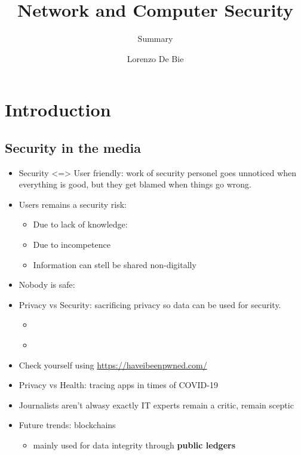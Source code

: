 \documentclass[11pt, faculty=ea]{ugent2016-report}
\title{Network and Computer Security}
\subtitle{Summary}
\author{Lorenzo De Bie}
\begin{document}
\maketitle
\tableofcontents

\chapter{Introduction} \label{cha:introduction}
\section{Security in the media} \label{sec:security-in-the-media}
    \begin{itemize}
        \item Security <=> User friendly: work of security personel goes unnoticed when everything is good, but they get blamed when things go wrong.
        \item Users remains a security risk:
            \begin{itemize}
                \item Due to lack of knowledge:  \cite{Rodriguez2014}
                \item Due to incompetence
                \item Information can stell be shared non-digitally
            \end{itemize}
        \item Nobody is safe:  \cite{Eeckhaut2014}
        \item Privacy vs Security: sacrificing privacy so data can be used for security.
            \begin{itemize}
                \item {} \cite{Derix2013}
                \item {} \cite{Follorou2013}
            \end{itemize}
        \item Check yourself using \url{https://haveibeenpwned.com/}
        \item Privacy vs Health: tracing apps in times of COVID-19
        \item Journalists aren't alwasy exactly IT experts \rightarrow remain a critic, remain sceptic
        \item Future trends: blockchains
            \begin{itemize}
                \item mainly used for data integrity through \textbf{public ledgers}

\end{itemize}
\end{itemize}
\end{document}
